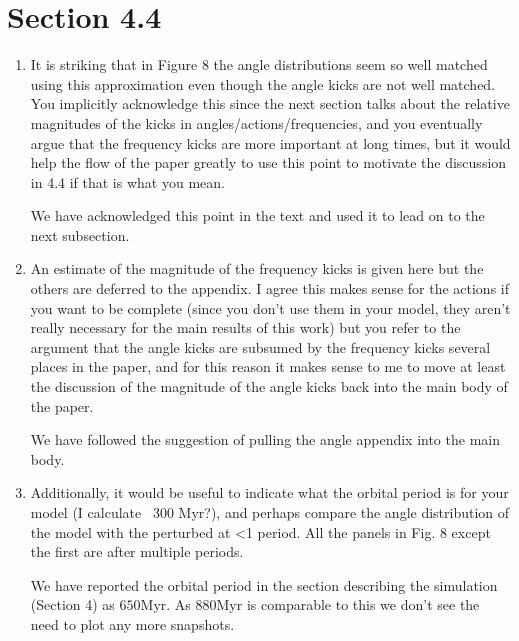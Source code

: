 \documentclass{article}
\begin{document}
\section{Section 4.4}
\begin{enumerate}
\item It is striking that in Figure 8 the angle distributions seem so well matched using this
approximation even though the angle kicks are not well matched. You implicitly
acknowledge this since the next section talks about the relative magnitudes of the kicks
in angles/actions/frequencies, and you eventually argue that the frequency kicks are
more important at long times, but it would help the flow of the paper greatly to use this
point to motivate the discussion in 4.4 if that is what you mean.

{\color{red} We have acknowledged this point in the text and used it to lead on to the next subsection.}

\item An estimate of the magnitude of the frequency kicks is given here but the others are
deferred to the appendix. I agree this makes sense for the actions if you want to be
complete (since you don’t use them in your model, they aren’t really necessary for the
main results of this work) but you refer to the argument that the angle kicks are
subsumed by the frequency kicks several places in the paper, and for this reason it
makes sense to me to move at least the discussion of the magnitude of the angle kicks
back into the main body of the paper.

{\color{red} We have followed the suggestion of pulling the angle appendix into the main body.}

\item Additionally, it would be useful to indicate what the orbital period is for your model (I
calculate ~300 Myr?), and perhaps compare the angle distribution of the model with the
perturbed at <1 period. All the panels in Fig. 8 except the first are after multiple
periods.

{\color{red} We have reported the orbital period in the section describing the simulation (Section 4) as $650\mathrm{Myr}$. As $880\mathrm{Myr}$ is comparable to this we don't see the need to plot any more snapshots.}
\end{enumerate}
\end{document}
